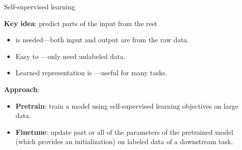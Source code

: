 \documentclass[usenames,dvipsnames,notes,11pt,aspectratio=169,hyperref={colorlinks=true, linkcolor=blue}]{beamer}
\begin{document}
\begin{frame}
    {Self-supervised learning}

    \textbf{Key idea}: predict parts of the input from the rest\\
    \begin{itemize}
        \item {} is needed---both input and output are from the raw data.
        \item Easy to ---only need unlabeled data.
        \item Learned representation is ---useful for many tasks.
    \end{itemize}

    \pause
    \textbf{Approach}:\\
    \begin{itemize}
        \item \textbf{Pretrain}: train a model using self-supervised learning objectives on large data.
        \item \textbf{Finetune}: update part or all of the parameters of the pretrained model (which provides an initialization) on labeled data of a downstream task.
    \end{itemize}
\end{frame}
\end{document}
